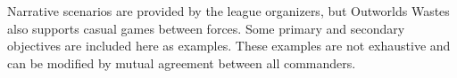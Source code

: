 Narrative scenarios are provided by the league organizers, but Outworlds Wastes also supports casual games between forces.
Some primary and secondary objectives are included here as examples.
These examples are not exhaustive and can be modified by mutual agreement between all commanders.
